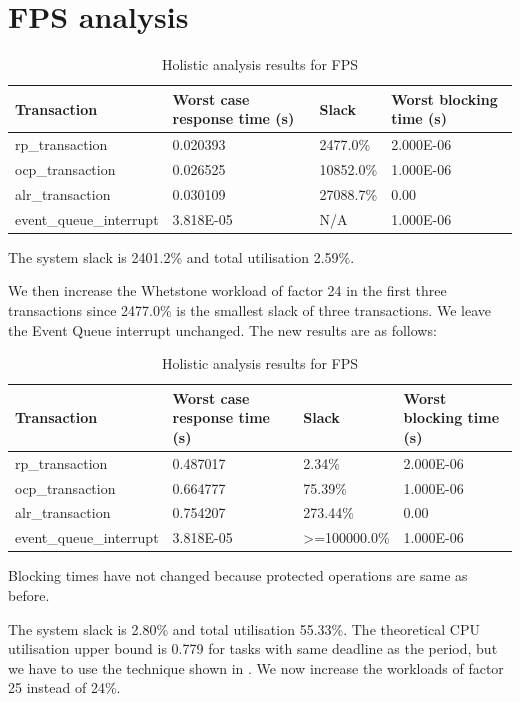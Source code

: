 \documentclass{article}
\begin{document}
\section{FPS analysis}

\begin{table}[!htbp]
  \centering
  \begin{tabular}{llll}
    \toprule
    Transaction & Worst case response time (s) & Slack & Worst blocking time (s)  \\
    \midrule
    rp\_transaction & 0.020393  & 2477.0\% &  2.000E-06  \\
    ocp\_transaction & 0.026525 & 10852.0\% & 1.000E-06 \\
    alr\_transaction & 0.030109 & 27088.7\% & 0.00 \\
    event\_queue\_interrupt & 3.818E-05 & N/A & 1.000E-06 \\
    \bottomrule
  \end{tabular}
  \caption{Holistic analysis results for FPS}
  \label{tab:holistic-fps}
\end{table}

The system slack is 2401.2\% and total utilisation 2.59\%.

We then increase the Whetstone workload of factor 24 in the first three transactions since 2477.0\% is the smallest slack of three transactions. We leave the Event Queue interrupt unchanged. The new results are as follows:

\begin{table}[!htbp]
   \centering
   \begin{tabular}{llll}
     \toprule
     Transaction & Worst case response time (s) & Slack & Worst blocking time (s)  \\
     \midrule
     rp\_transaction & 0.487017  & 2.34\% &  2.000E-06  \\
     ocp\_transaction & 0.664777 & 75.39\% & 1.000E-06 \\
     alr\_transaction & 0.754207 & 273.44\% & 0.00 \\
     event\_queue\_interrupt & 3.818E-05 & >=100000.0\% & 1.000E-06 \\
     \bottomrule
   \end{tabular}
   \caption{Holistic analysis results for FPS}
   \label{tab:holistic-fps}
\end{table}

Blocking times have not changed because protected operations are same as before.

The system slack is 2.80\% and total utilisation 55.33\%. The theoretical CPU utilisation upper bound \cite{liu-utilisation-bound} is 0.779 for tasks with same deadline as the period, but we have to use the technique shown in \cite{practitioner-utilisation-bound}. We now increase the workloads of factor 25 instead of 24\%.
\end{document}
